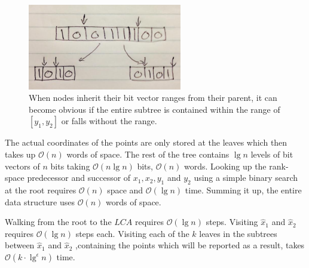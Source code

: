 \begin{figure}[H]
    \centering
    \includegraphics[width=0.6\textwidth]{pictures/bit_vector_split.png}
    \caption{When nodes inherit their bit vector ranges from their parent, it can become obvious if the entire subtree is contained within the range of $[y_1, y_2]$ or falls without the range.}
    \label{fig:bitvectorsplit}
\end{figure}



The actual coordinates of the points are only stored at the leaves which then takes up $\mathcal{O}(n)$  words of space. The rest of the tree contains $\lg n$ levels of bit vectors of $n$ bits taking $\mathcal{O}(n \lg n)$ bits, $\mathcal{O}(n)$ words. Looking up the rank-space predecessor and successor of $x_1, x_2, y_1$ and $y_2$ using a simple binary search at the root requires $\mathcal{O}(n)$ space and $\mathcal{O}(\lg n)$ time. Summing it up, the entire data structure uses $\mathcal{O}(n)$ words of space. 

Walking from the root to the $LCA$ requires $\mathcal{O}(\lg n)$ steps. Visiting $\hat{x}_1$ and $\hat{x}_2$ requires $\mathcal{O}(\lg n)$ steps each. Visiting each of the $k$ leaves in the subtrees between $\hat{x}_1$ and $\hat{x}_2$ ,containing the points which will be reported as a result, takes $\mathcal{O}(k \cdot \lg^\epsilon n)$ time.

